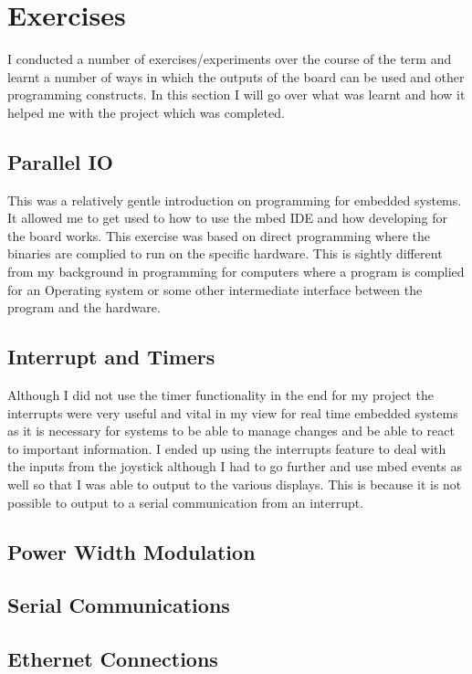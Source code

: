 \documentclass[a4paper,12pt]{scrartcl}
\begin{document}
	\section{Exercises}
	{
		I conducted a number of exercises/experiments over the course of the term and learnt a number of ways in which the outputs of the board can be used and other programming constructs. In this section I will go over what was learnt and how it helped me with the project which was completed.
		\subsection{Parallel IO}
		{
			This was a relatively gentle introduction on programming for embedded systems. It allowed me to get used to how to use the mbed IDE and how developing for the board works. This exercise was based on direct programming where the binaries are complied to run on the specific hardware. This is sightly different from my background in programming for computers where a program is complied for an Operating system or some other intermediate interface between the program and the hardware. 
		}
		\subsection{Interrupt and Timers}
		{
			Although I did not use the timer functionality in the end for my project the interrupts were very useful and vital in my view for real time embedded systems as it is necessary for systems to be able to manage changes and be able to react to important information. I ended up using the interrupts feature to deal with the inputs from the joystick although I had to go further and use mbed events\cite{Jongboom2018} as well so that I was able to output to the various displays. This is because it is not possible to output to a serial communication from an interrupt.
		}
		\subsection{Power Width Modulation}
		{
			
		}
		\subsection{Serial Communications}
		{
			
		}
		\subsection{Ethernet Connections}
		{
			
		}
		
	}
\end{document}
